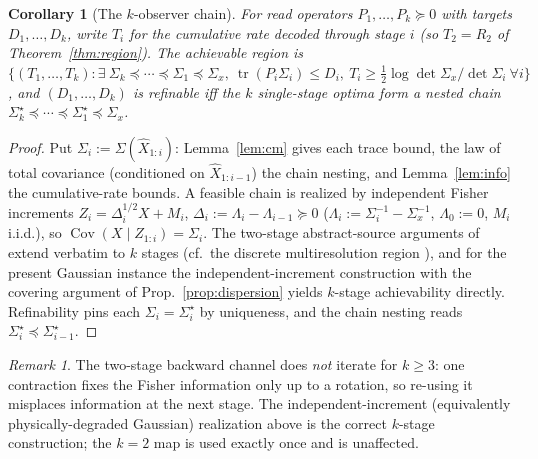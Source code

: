 \documentclass[lettersize,onecolumn]{IEEEtran}
\newtheorem{corollary}{Corollary}
\theoremstyle{definition}
\theoremstyle{remark}
\newtheorem*{remark}{Remark}
\newcommand{\tr}{\operatorname{tr}}
\newcommand{\Cov}{\operatorname{Cov}}
\begin{document}
\begin{corollary}[The $k$-observer chain]\label{cor:kobs}
For read operators $P_1,\dots,P_k\succeq0$ with targets $D_1,\dots,D_k$, write $T_i$ for
the \emph{cumulative} rate decoded through stage $i$ (so $T_2=R_2$ of
Theorem~\ref{thm:region}). The achievable region is
$\{(T_1,\dots,T_k):\exists\ \Sigma_k\preceq\cdots\preceq\Sigma_1\preceq\Sigma_x,\
\tr(P_i\Sigma_i)\le D_i,\ T_i\ge\tfrac12\log\det\Sigma_x/\det\Sigma_i\ \forall i\}$, and
$(D_1,\dots,D_k)$ is refinable iff the $k$ single-stage optima form a nested chain
$\Sigma_k^\star\preceq\cdots\preceq\Sigma_1^\star\preceq\Sigma_x$.
\end{corollary}
\begin{proof}
Put $\Sigma_i:=\Sigma(\hat X_{1:i})$: Lemma~\ref{lem:cm} gives each trace bound, the law
of total covariance (conditioned on $\hat X_{1:i-1}$) the chain nesting, and
Lemma~\ref{lem:info} the cumulative-rate bounds. A feasible chain is realized by
independent Fisher increments $Z_i=\Delta_i^{1/2}X+M_i$, $\Delta_i:=\Lambda_i-
\Lambda_{i-1}\succeq0$ ($\Lambda_i:=\Sigma_i^{-1}-\Sigma_x^{-1}$, $\Lambda_0:=0$, $M_i$
i.i.d.), so $\Cov(X\mid Z_{1:i})=\Sigma_i$. The two-stage abstract-source arguments of
\cite{kostinatuncel} extend verbatim to $k$ stages (cf.\ the discrete multiresolution
region \cite{effros}), and for the present Gaussian instance the independent-increment
construction with the covering argument of Prop.~\ref{prop:dispersion} yields $k$-stage
achievability directly. Refinability pins each
$\Sigma_i=\Sigma_i^\star$ by uniqueness, and the chain nesting reads $\Sigma_i^\star
\preceq\Sigma_{i-1}^\star$.
\end{proof}
\begin{remark}
The two-stage backward channel does \emph{not} iterate for $k\ge3$: one contraction fixes
the Fisher information only up to a rotation, so re-using it misplaces information at the
next stage. The independent-increment (equivalently physically-degraded Gaussian)
realization above is the correct $k$-stage construction; the $k=2$ map is used exactly
once and is unaffected.
\end{remark}
\end{document}
